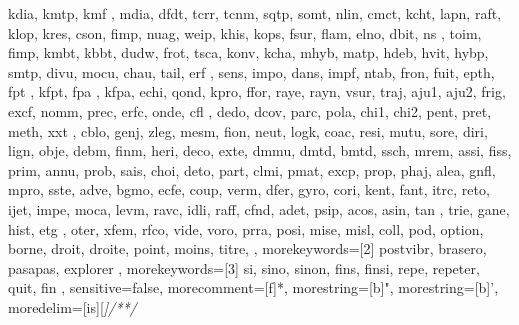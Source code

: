 {{        kdia, kmtp, kmf , mdia, dfdt, tcrr, tcnm, sqtp, somt,
        nlin, cmct, kcht, lapn, raft, klop, kres, cson, fimp, 
        nuag, weip, khis, kops, fsur, flam, elno,
        dbit, ns  , toim, fimp, kmbt, kbbt, dudw, frot, tsca,
        konv, kcha, mhyb, matp, hdeb, hvit, hybp, smtp, divu,
        mocu, chau, tail, erf , sens, impo, dans, impf, ntab,
        fron, fuit, epth, fpt , kfpt, fpa , kfpa, echi, qond,
        kpro, ffor, raye, rayn, vsur, traj, aju1, aju2, frig,
        excf, nomm, prec, erfc, onde, cfl , dedo, dcov, parc,
        pola, chi1, chi2, pent, pret, meth, xxt , cblo, genj,
        zleg, mesm, fion, neut, logk, coac, resi, mutu, sore,
        diri, lign, obje, debm, finm, heri, deco, exte, dmmu,
        dmtd, bmtd, ssch, mrem, assi, fiss, prim, annu, prob,
        sais, choi, deto, part, clmi, pmat, excp, prop, phaj,
        alea, gnfl, mpro, sste, adve, bgmo, ecfe, coup, verm,
        dfer, gyro, cori, kent, fant, itrc, reto, ijet, impe,
        moca, levm, ravc, idli, raff, cfnd, adet, psip, acos,
        asin, tan , trie, gane, hist, etg , oter, xfem, rfco,
        vide, voro, prra, posi, mise, misl, coll, pod,  
        option, borne, droit, droite, point, moins, titre, %
    },
    morekeywords=[2]{  %
        postvibr, brasero, pasapas, explorer
    },
    morekeywords=[3]{  %
        si, sino, sinon, fins, finsi,
        repe, repeter, quit, fin
    },
    sensitive=false, %
    morecomment=[f]*, %
    morestring=[b]", %
    morestring=[b]', %
    moredelim=[is][\sffamily\slshape\color{bleujoli}]{/*}{*/}
}
